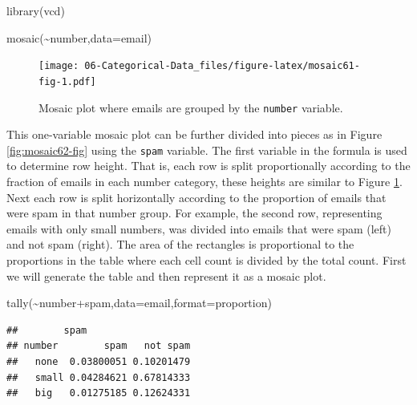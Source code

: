 \documentclass[
]{book}
\newenvironment{Shaded}{\begin{snugshade}}{\end{snugshade}}
\newcommand{\AttributeTok}[1]{\textcolor[rgb]{0.77,0.63,0.00}{#1}}
\newcommand{\FunctionTok}[1]{\textcolor[rgb]{0.00,0.00,0.00}{#1}}
\newcommand{\NormalTok}[1]{#1}
\newcommand{\SpecialCharTok}[1]{\textcolor[rgb]{0.00,0.00,0.00}{#1}}
\newcommand{\StringTok}[1]{\textcolor[rgb]{0.31,0.60,0.02}{#1}}
\begin{document}
\begin{Shaded}
\begin{Highlighting}[]
\FunctionTok{library}\NormalTok{(vcd)}
\end{Highlighting}
\end{Shaded}



\begin{Shaded}
\begin{Highlighting}[]
\FunctionTok{mosaic}\NormalTok{(}\SpecialCharTok{\textasciitilde{}}\NormalTok{number,}\AttributeTok{data=}\NormalTok{email)}
\end{Highlighting}
\end{Shaded}

\begin{figure}
\centering
\texttt{[image: 06-Categorical-Data\_files/figure-latex/mosaic61-fig-1.pdf]}
\caption{\label{fig:mosaic61-fig}Mosaic plot where emails are grouped by the \texttt{number} variable.}
\end{figure}

This one-variable mosaic plot can be further divided into pieces as in Figure \ref{fig:mosaic62-fig} using the \texttt{spam} variable. The first variable in the formula is used to determine row height. That is, each row is split proportionally according to the fraction of emails in each number category, these heights are similar to Figure \ref{fig:mosaic61-fig}. Next each row is split horizontally according to the proportion of emails that were spam in that number group. For example, the second row, representing emails with only small numbers, was divided into emails that were spam (left) and not spam (right). The area of the rectangles is proportional to the proportions in the table where each cell count is divided by the total count. First we will generate the table and then represent it as a mosaic plot.

\begin{Shaded}
\begin{Highlighting}[]
\FunctionTok{tally}\NormalTok{(}\SpecialCharTok{\textasciitilde{}}\NormalTok{number}\SpecialCharTok{+}\NormalTok{spam,}\AttributeTok{data=}\NormalTok{email,}\AttributeTok{format=}\StringTok{\textquotesingle{}proportion\textquotesingle{}}\NormalTok{)}
\end{Highlighting}
\end{Shaded}

\begin{verbatim}
##        spam
## number        spam   not spam
##   none  0.03800051 0.10201479
##   small 0.04284621 0.67814333
##   big   0.01275185 0.12624331
\end{verbatim}
\end{document}
